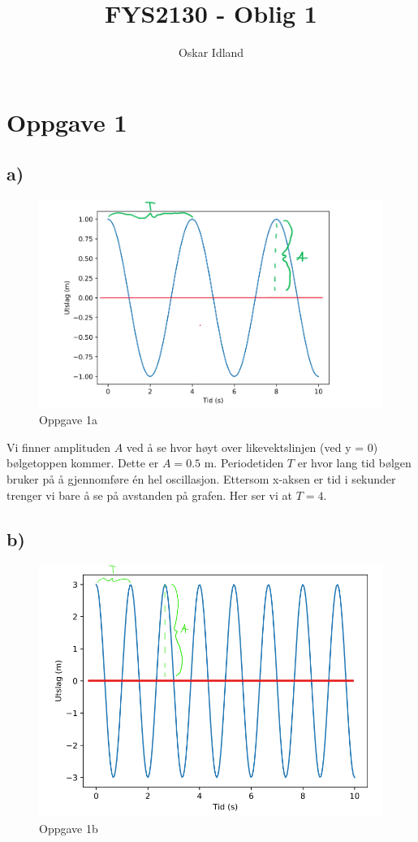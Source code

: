 \documentclass{article}
\author{Oskar Idland}
\title{FYS2130 - Oblig 1}
\date{}
\begin{document}
\maketitle
\newpage

\section*{Oppgave 1}
\subsection*{a)}
\begin{figure}[h!]
  \centering
  \includegraphics[scale = .5]{Figures/1.a.png}
  \caption{Oppgave 1a}
  \label{fig: 1a}
\end{figure}

Vi finner amplituden $A$ ved å se hvor høyt over likevektslinjen (ved y = 0) bølgetoppen kommer. Dette er $A = 0.5$ m. Periodetiden $T$ er hvor lang tid bølgen bruker på å gjennomføre én hel oscillasjon. Ettersom x-aksen er tid i sekunder trenger vi bare å se på avstanden på grafen. Her ser vi at $T = 4$. 

\subsection*{b)}
\begin{figure}[h!]
  \centering
  \includegraphics[scale = .5]{Figures/1.b.png}
  \caption{Oppgave 1b}
  \label{fig: 1b}
\end{figure}
\end{document}
